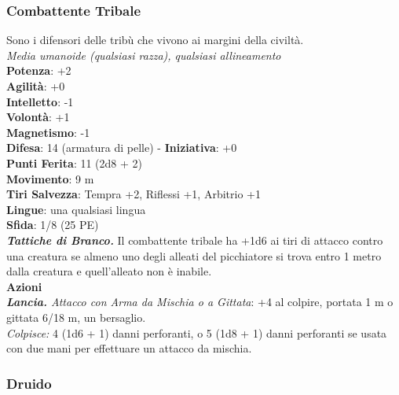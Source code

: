 \begin{multicols}{2}
\subsubsection{Combattente Tribale}
Sono i difensori delle tribù che vivono ai margini della civiltà.\\
\emph{Media umanoide (qualsiasi razza), qualsiasi allineamento}\\
\textbf{Potenza}: +2\\
\textbf{Agilità}: +0\\
\textbf{Intelletto}: -1\\
\textbf{Volontà}: +1\\
\textbf{Magnetismo}: -1\\
\textbf{Difesa}: 14 (armatura di pelle) - \textbf{Iniziativa}: +0\\
\textbf{Punti Ferita}: 11 (2d8 + 2)\\
\textbf{Movimento}: 9 m\\
\textbf{Tiri Salvezza}: Tempra +2, Riflessi +1, Arbitrio +1 \\
\textbf{Lingue}: una qualsiasi lingua\\
\textbf{Sfida}: 1/8 (25 PE)\smallskip\\
\emph{\textbf{Tattiche di Branco.}} Il combattente tribale ha +1d6 ai tiri di attacco contro una creatura se almeno uno degli alleati del picchiatore si trova entro 1 metro dalla creatura e quell'alleato non è inabile.\\
\smallskip\textbf{Azioni}\\
\emph{\textbf{Lancia.} Attacco con Arma da Mischia o a Gittata}: +4 al colpire, portata 1 m o gittata 6/18 m, un bersaglio.\\
\emph{Colpisce:} 4 (1d6 + 1) danni perforanti, o 5 (1d8 + 1) danni perforanti se usata con due mani per effettuare un attacco da mischia.\\

\subsubsection{Druido}


\end{multicols}
